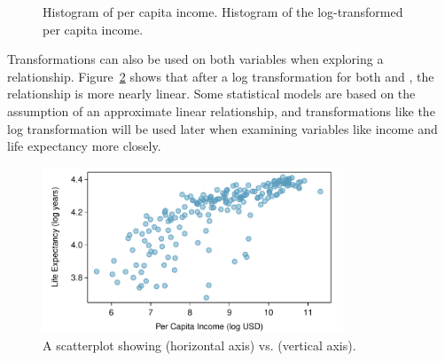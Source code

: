 \begin{figure}[ht]
\centering
{}
\caption{ Histogram of per capita income.  Histogram of the log-transformed per capita income.}
\label{incomeHistTransform}
\end{figure}

Transformations can also be used on both variables when exploring a relationship. Figure~\ref{incomeLifeExpectancyLog} shows that after a log transformation for both  and , the relationship is more nearly linear.  Some statistical models are based on the assumption of an approximate linear relationship, and transformations like the log transformation will be used later when examining variables like income and life expectancy more closely.

\begin{figure}
\centering
\includegraphics[width=0.8\textwidth]
{ch_intro_to_data_oi_biostat/figures/incomeLifeExpectancyLog/incomeLifeExpectancyLog.pdf}
\caption{A scatterplot showing  (horizontal axis) vs.   (vertical axis).} 
\label{incomeLifeExpectancyLog}
\end{figure}


